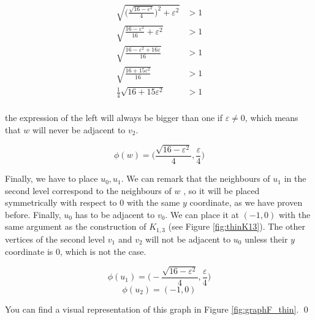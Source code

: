 {\begin{equation*}
  \begin{split}
    \sqrt{\Bigg(\frac{\sqrt{16 - \varepsilon^2}}{4}\Bigg)^2 + \varepsilon^2} &> 1\\
    \sqrt{\frac{16 - \varepsilon^2}{16} + \varepsilon^2} &> 1\\
    \sqrt{\frac{16 - \varepsilon^2 + 16\varepsilon}{16}} &> 1\\
    \sqrt{\frac{16 + 15\varepsilon^2}{16}} &> 1\\
    \frac{1}{4}\sqrt{16 + 15\varepsilon^2} &> 1\\
  \end{split}
\end{equation*}

the expression of the left will always be bigger than one if $\varepsilon \neq 0$, which means that $w$ will never be adjacent to $v_2$.

$$\phi(w) = \Bigg(\frac{\sqrt{16 - \varepsilon^2}}{4}, \frac{\varepsilon}{4}\Bigg)$$

Finally, we have to place $u_0, u_1$. We can remark that the neighbours of $u_1$ in the second level correspond to the neighbours of $w$ , so it will be placed symmetrically with respect to 0 with the same $y$ coordinate, as we have proven before. Finally, $u_0$ has to be adjacent to $v_0$. We can place it at $(-1,0)$ with the same argument as the construction of $K_{1,3}$ (see Figure \ref{fig:thinK13}). The other vertices of the second level $v_1$ and $v_2$ will not be adjacent to $u_0$ unless their $y$ coordinate is 0, which is not the case.

$$\phi(u_1) = \Bigg(-\frac{\sqrt{16 - \varepsilon^2}}{4}, \frac{\varepsilon}{4}\Bigg)$$
$$\phi(u_2) = (-1, 0)$$

You can find a visual representation of this graph in Figure \ref{fig:graphF_thin}. \qed
}


